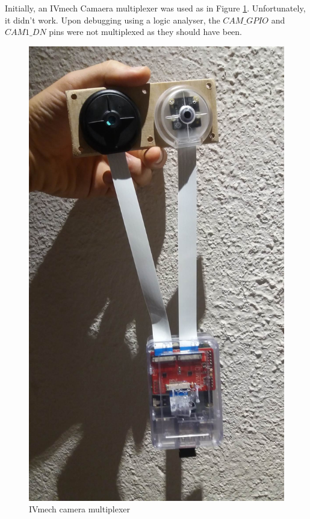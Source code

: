 Initially, an IVmech Camaera multiplexer was used as in Figure \ref{fig:ivmech}. Unfortunately, it didn't work. Upon debugging using a logic analyser, the $CAM\_GPIO$ and $CAM1\_DN$ pins were not multiplexed as they should have been.

\begin{figure}[H]
\centering
\includegraphics[scale=0.25]{images/ivmech.jpg}
\caption{IVmech camera multiplexer}
\label{fig:ivmech}
\end{figure}

